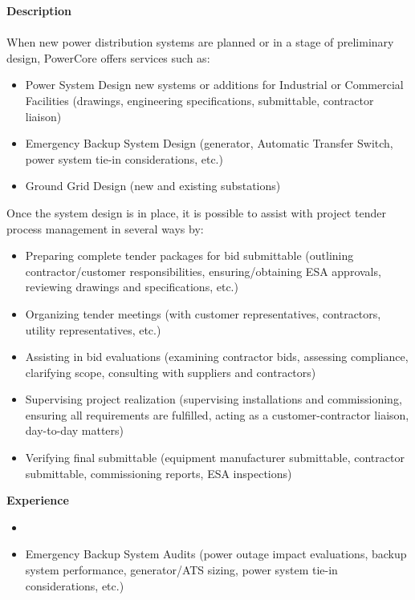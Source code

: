 \textbf{Description}\\
\\
When new power distribution systems are planned or in a stage of preliminary design, PowerCore offers services such as:
\begin{itemize}
	\item Power System Design new systems or additions for Industrial or Commercial Facilities (drawings, engineering specifications, submittable, contractor liaison)
	\item Emergency Backup System Design (generator, Automatic Transfer Switch, power system tie-in considerations, etc.)
	\item Ground Grid Design (new and existing substations)
\end{itemize}
Once the system design is in place, it is possible to assist with project tender process management in several ways by:
\begin{itemize}
	\item Preparing complete tender packages for bid submittable (outlining contractor/customer responsibilities, ensuring/obtaining ESA approvals, reviewing drawings and specifications, etc.)
	\item Organizing tender meetings (with customer representatives, contractors, utility representatives, etc.)
	\item Assisting in bid evaluations (examining contractor bids, assessing compliance, clarifying scope, consulting with suppliers and contractors)
	\item Supervising project realization (supervising installations and commissioning, ensuring all requirements are fulfilled, acting as a customer-contractor liaison, day-to-day matters)
	\item Verifying final submittable (equipment manufacturer submittable, contractor submittable, commissioning reports, ESA inspections)

\end{itemize}
\textbf{Experience}\\
\begin{itemize}
	\item 	
	\item Emergency Backup System Audits (power outage impact evaluations, backup system performance, generator/ATS sizing, power system tie-in considerations, etc.)

\end{itemize}
	
